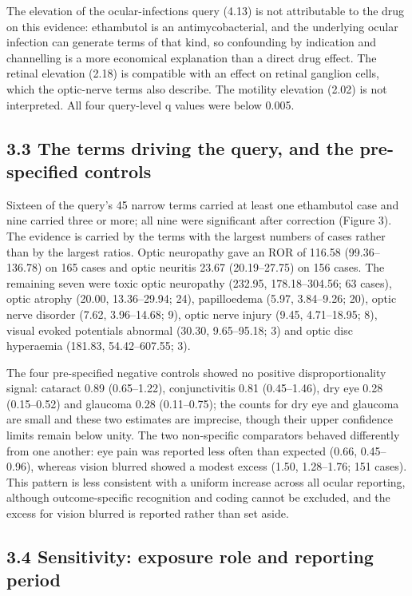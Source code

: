 \documentclass[12pt,a4paper]{article}
\begin{document}
The elevation of the ocular-infections query (4.13) is not attributable to the drug on this evidence: ethambutol is an antimycobacterial, and the underlying ocular infection can generate terms of that kind, so confounding by indication and channelling is a more economical explanation than a direct drug effect. The retinal elevation (2.18) is compatible with an effect on retinal ganglion cells, which the optic-nerve terms also describe. The motility elevation (2.02) is not interpreted. All four query-level q values were below 0.005.

\subsection*{3.3 The terms driving the query, and the pre-specified controls}

Sixteen of the query's 45 narrow terms carried at least one ethambutol case and nine carried three or more; all nine were significant after correction (Figure 3). The evidence is carried by the terms with the largest numbers of cases rather than by the largest ratios. Optic neuropathy gave an ROR of 116.58 (99.36–136.78) on 165 cases and optic neuritis 23.67 (20.19–27.75) on 156 cases. The remaining seven were toxic optic neuropathy (232.95, 178.18–304.56; 63 cases), optic atrophy (20.00, 13.36–29.94; 24), papilloedema (5.97, 3.84–9.26; 20), optic nerve disorder (7.62, 3.96–14.68; 9), optic nerve injury (9.45, 4.71–18.95; 8), visual evoked potentials abnormal (30.30, 9.65–95.18; 3) and optic disc hyperaemia (181.83, 54.42–607.55; 3).

The four pre-specified negative controls showed no positive disproportionality signal: cataract 0.89 (0.65–1.22), conjunctivitis 0.81 (0.45–1.46), dry eye 0.28 (0.15–0.52) and glaucoma 0.28 (0.11–0.75); the counts for dry eye and glaucoma are small and these two estimates are imprecise, though their upper confidence limits remain below unity. The two non-specific comparators behaved differently from one another: eye pain was reported less often than expected (0.66, 0.45–0.96), whereas vision blurred showed a modest excess (1.50, 1.28–1.76; 151 cases). This pattern is less consistent with a uniform increase across all ocular reporting, although outcome-specific recognition and coding cannot be excluded, and the excess for vision blurred is reported rather than set aside.

\subsection*{3.4 Sensitivity: exposure role and reporting period}
\end{document}
